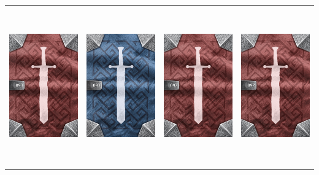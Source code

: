\documentclass{minimal}
\begin{document}
{\begin{longtable}{llll}
\includegraphics[width=44mm,height=68mm]{./64-151/gh-093b-scroll-of-power-back.png} &
\includegraphics[width=44mm,height=68mm]{./64-151/gh-093a-scroll-of-power-back.png} &
\includegraphics[width=44mm,height=68mm]{./64-151/gh-092b-dampening-ring-back.png} &
\includegraphics[width=44mm,height=68mm]{./64-151/gh-092b-dampening-ring-back.png}\\ 

\end{longtable}}
\end{document}

